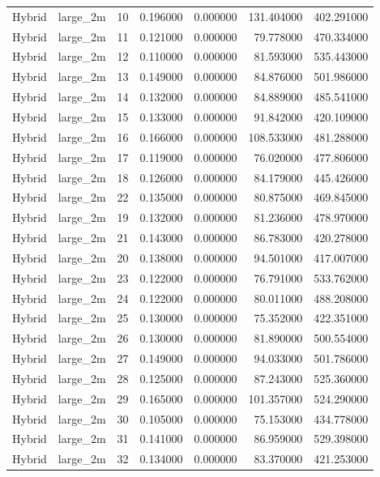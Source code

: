 \begin{tabular}{llrrrrr}
Hybrid & large_2m & 10 & 0.196000 & 0.000000 & 131.404000 & 402.291000 \\
Hybrid & large_2m & 11 & 0.121000 & 0.000000 & 79.778000 & 470.334000 \\
Hybrid & large_2m & 12 & 0.110000 & 0.000000 & 81.593000 & 535.443000 \\
Hybrid & large_2m & 13 & 0.149000 & 0.000000 & 84.876000 & 501.986000 \\
Hybrid & large_2m & 14 & 0.132000 & 0.000000 & 84.889000 & 485.541000 \\
Hybrid & large_2m & 15 & 0.133000 & 0.000000 & 91.842000 & 420.109000 \\
Hybrid & large_2m & 16 & 0.166000 & 0.000000 & 108.533000 & 481.288000 \\
Hybrid & large_2m & 17 & 0.119000 & 0.000000 & 76.020000 & 477.806000 \\
Hybrid & large_2m & 18 & 0.126000 & 0.000000 & 84.179000 & 445.426000 \\
Hybrid & large_2m & 22 & 0.135000 & 0.000000 & 80.875000 & 469.845000 \\
Hybrid & large_2m & 19 & 0.132000 & 0.000000 & 81.236000 & 478.970000 \\
Hybrid & large_2m & 21 & 0.143000 & 0.000000 & 86.783000 & 420.278000 \\
Hybrid & large_2m & 20 & 0.138000 & 0.000000 & 94.501000 & 417.007000 \\
Hybrid & large_2m & 23 & 0.122000 & 0.000000 & 76.791000 & 533.762000 \\
Hybrid & large_2m & 24 & 0.122000 & 0.000000 & 80.011000 & 488.208000 \\
Hybrid & large_2m & 25 & 0.130000 & 0.000000 & 75.352000 & 422.351000 \\
Hybrid & large_2m & 26 & 0.130000 & 0.000000 & 81.890000 & 500.554000 \\
Hybrid & large_2m & 27 & 0.149000 & 0.000000 & 94.033000 & 501.786000 \\
Hybrid & large_2m & 28 & 0.125000 & 0.000000 & 87.243000 & 525.360000 \\
Hybrid & large_2m & 29 & 0.165000 & 0.000000 & 101.357000 & 524.290000 \\
Hybrid & large_2m & 30 & 0.105000 & 0.000000 & 75.153000 & 434.778000 \\
Hybrid & large_2m & 31 & 0.141000 & 0.000000 & 86.959000 & 529.398000 \\
Hybrid & large_2m & 32 & 0.134000 & 0.000000 & 83.370000 & 421.253000 \\

\end{tabular}
